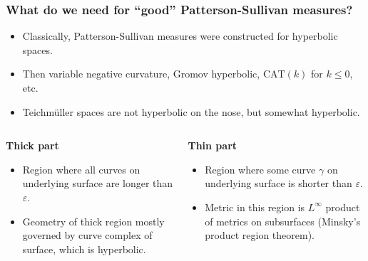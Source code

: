 \begin{frame}
  \frametitle{What do we need for ``good'' Patterson-Sullivan measures?}
  \begin{itemize}
  \item<2-> Classically, Patterson-Sullivan measures were constructed for hyperbolic spaces.
  \item<3-> Then variable negative curvature, Gromov hyperbolic, $\mathrm{CAT}(k)$ for $k \leq 0$, etc.
  \item<4-> Teichmüller spaces are not hyperbolic on the nose, but somewhat hyperbolic.
  \end{itemize}
 \begin{columns}
    {
\begin{column}{0.5\textwidth}
  \begin{center}
     \textbf{Thick part}
  \end{center}
  \begin{itemize}
  \item<6-> Region where all curves on underlying surface are longer than $\varepsilon$.
  \item<7-> Geometry of thick region mostly governed by curve complex of surface, which is hyperbolic.
  \end{itemize}
  \vspace{4.4cm}
\end{column}
   }

 {
\begin{column}{0.5\textwidth}  %
    \begin{center}
      \textbf{Thin part}
     \end{center}
     \begin{itemize}
     \item<9-> Region where some curve $\gamma$ on underlying surface is shorter than $\varepsilon$.
     \item<10-> Metric in this region is $L^{\infty}$ product of metrics on subsurfaces (Minsky's product region theorem).
     \end{itemize}
\end{column}
}


\end{columns}
\end{frame}
